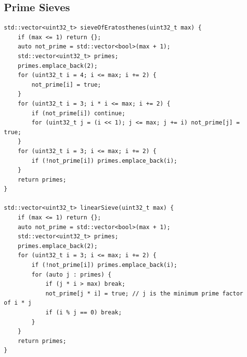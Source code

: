 \documentclass[UTF8]{article}
\begin{document}
\subsection{Prime Sieves}
\begin{verbatim}
std::vector<uint32_t> sieveOfEratosthenes(uint32_t max) {
	if (max <= 1) return {};
	auto not_prime = std::vector<bool>(max + 1);
	std::vector<uint32_t> primes;
	primes.emplace_back(2);
	for (uint32_t i = 4; i <= max; i += 2) {
		not_prime[i] = true;
	}
	for (uint32_t i = 3; i * i <= max; i += 2) {
		if (not_prime[i]) continue;
		for (uint32_t j = (i << 1); j <= max; j += i) not_prime[j] = true;
	}
	for (uint32_t i = 3; i <= max; i += 2) {
		if (!not_prime[i]) primes.emplace_back(i);
	}
	return primes;
}

std::vector<uint32_t> linearSieve(uint32_t max) {
	if (max <= 1) return {};
	auto not_prime = std::vector<bool>(max + 1);
	std::vector<uint32_t> primes;
	primes.emplace_back(2);
	for (uint32_t i = 3; i <= max; i += 2) {
		if (!not_prime[i]) primes.emplace_back(i);
		for (auto j : primes) {
			if (j * i > max) break;
			not_prime[j * i] = true; // j is the minimum prime factor of i * j
			if (i % j == 0) break;
		}
	}
	return primes;
}
\end{verbatim}
\end{document}
